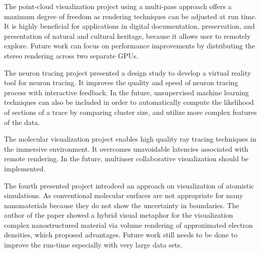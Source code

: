 \documentclass[10pt,twocolumn,letterpaper]{article}
\begin{document}
The point-cloud visualization project \cite{discher_point-based_2018} using a multi-pass approach offers a maximum degree of freedom as rendering techniques can be adjusted at run time. It is highly beneficial for applications in digital documentation, preservation, and presentation of natural and cultural heritage, because it allows user to remotely explore. Future work can focus on performance improvements by distributing the stereo rendering across two separate GPUs.

The neuron tracing project \cite{Usher2018} presented a design study to develop a virtual reality tool for neuron tracing. It improves the quality and speed of neuron tracing process with interactive feedback. In the future, unsupervised machine learning techniques can also be included in order to automatically compute the likelihood of sections of a trace by comparing cluster size, and utilize more complex features of the data.

The molecular visualization project \cite{stone_immersive_2016} enables high quality ray tracing techniques in the immersive environment. It overcomes unavoidable latencies associated with remote rendering. In the future, multiuser collaborative visualization should be implemented.

The fourth presented project \cite{reda_visualizing_2013} introdced an approach on visualization of atomistic simulations. As conventional molecular surfaces are not appropriate for many nanomaterials because they do not show the uncertainty in boundaries. The author of the paper showed a hybrid visual metaphor for the visualization complex nanostructured material via volume rendering of approximated electron densities, which proposed advantages. Future work still needs to be done to improve the run-time especially with very large data sets.

{\small


}
\end{document}
